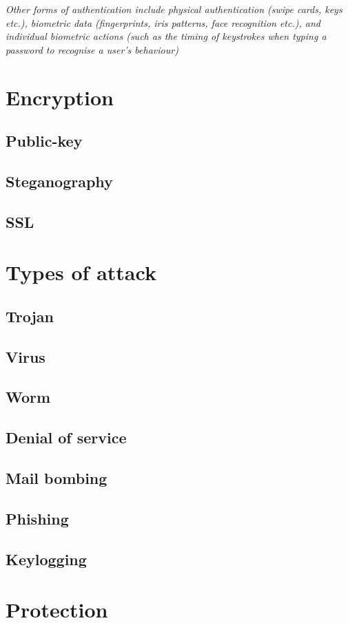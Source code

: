 \documentclass[a4paper,oneside]{report}
\begin{document}
	\emph{Other forms of authentication include physical authentication (swipe cards, keys etc.), biometric data (fingerprints, iris patterns, face recognition etc.), and individual biometric actions (such as the timing of keystrokes when typing a password to recognise a user's behaviour)}

	\section{Encryption}
    	\subsection{Public-key}
    	\subsection{Steganography}
    	\subsection{SSL}
  	\section{Types of attack}
    	\subsection{Trojan}
    	\subsection{Virus}
    	\subsection{Worm}
    	\subsection{Denial of service}
    	\subsection{Mail bombing}
    	\subsection{Phishing}
    	\subsection{Keylogging}
  	\section{Protection}
\end{document}
